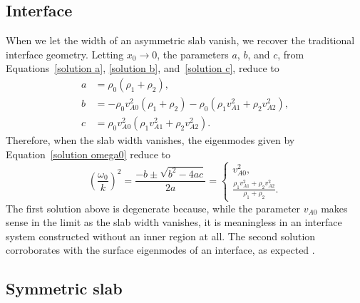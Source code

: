 \documentclass{aastex61}
\begin{document}
\subsection{Interface}\label{app: interface}
When we let the width of an asymmetric slab vanish, we recover the traditional interface geometry. Letting $x_0 \to 0$, the parameters $a$, $b$, and $c$, from Equations~\eqref{solution a}, \eqref{solution b}, and~\eqref{solution c}, reduce to
\begin{align}
a &= \rho_0(\rho_1 + \rho_2), \\
b &= -\rho_0v_{A0}^2(\rho_1 +\rho_2) - \rho_0(\rho_1v_{A1}^2 + \rho_2v_{A2}^2), \\
c &= \rho_0v_{A0}^2(\rho_1v_{A1}^2 + \rho_2v_{A2}^2).
\end{align}
Therefore, when the slab width vanishes, the eigenmodes given by Equation~\eqref{solution omega0} reduce to
\begin{equation}
\left(\frac{\omega_0}{k}\right)^2 = \frac{-b \pm \sqrt{b^2 - 4ac}}{2a} =
\begin{cases}
v_{A0}^2, \\
\frac{\rho_1v_{A1}^2 + \rho_2v_{A2}^2}{\rho_1 + \rho_2}.
\end{cases}
\end{equation}
The first solution above is degenerate because, while the parameter $v_{A0}$ makes sense in the limit as the slab width vanishes, it is meaningless in an interface system constructed without an inner region at all. The second solution corroborates with the surface eigenmodes of an interface, as expected \citep{rob81a}.



\subsection{Symmetric slab}\label{app: symmetric}
\end{document}
